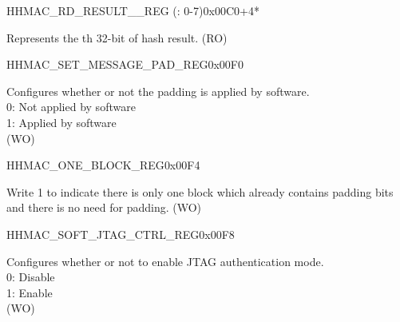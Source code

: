 \begin{register}{H}{HMAC\_RD\_RESULT\_\_REG (: 0-7)}{0x00C0+4*}\label{regdesc:HMACRDRESULTNREG}
%
\regnewline%
\begin{regdesc}\begin{reglist}
\label{fielddesc:HMACRDATAN}\item [HMAC\_RDATA\_\regindex{n}] Represents the th 32-bit of hash result. (RO)
\end{reglist}\end{regdesc}
\end{register}


\begin{register}{H}{HMAC\_SET\_MESSAGE\_PAD\_REG}{0x00F0}\label{regdesc:HMACSETMESSAGEPADREG}
%
%
\regnewline%
\begin{regdesc}\begin{reglist}
\label{fielddesc:HMACSETTEXTPAD}\item [HMAC\_SET\_TEXT\_PAD] Configures whether or not the padding is applied by software.
\\0: Not applied by software
\\1: Applied by software
\\(WO)
\end{reglist}\end{regdesc}
\end{register}


\begin{register}{H}{HMAC\_ONE\_BLOCK\_REG}{0x00F4}\label{regdesc:HMACONEBLOCKREG}
%
%
\regnewline%
\begin{regdesc}\begin{reglist}
\label{fielddesc:HMACSETONEBLOCK}\item [HMAC\_SET\_ONE\_BLOCK] Write 1 to indicate there is only one block which already contains padding bits and there is no need for padding. (WO)
\end{reglist}\end{regdesc}
\end{register}


\begin{register}{H}{HMAC\_SOFT\_JTAG\_CTRL\_REG}{0x00F8}\label{regdesc:HMACSOFTJTAGCTRLREG}
%
%
\regnewline%
\begin{regdesc}\begin{reglist}
\label{fielddesc:HMACSOFTJTAGCTRL}\item [HMAC\_SOFT\_JTAG\_CTRL] Configures whether or not to enable JTAG authentication mode.
\\0: Disable
\\1: Enable
\\(WO)
\end{reglist}\end{regdesc}
\end{register}


